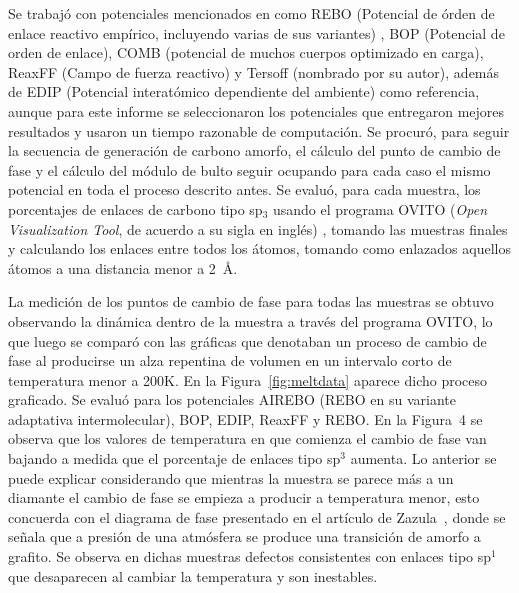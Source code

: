 \documentclass[aps,prl,twocolumn,superscriptaddress,groupedaddress]{revtex4}
\begin{document}
 Se trabajó con potenciales mencionados en \cite{ACPot1} como REBO (Potencial de órden de enlace reactivo empírico, incluyendo varias de sus variantes) , BOP (Potencial de orden de enlace), COMB (potencial de muchos cuerpos optimizado en carga), ReaxFF (Campo de fuerza reactivo) y Tersoff (nombrado por su autor), además de EDIP (Potencial interatómico dependiente del ambiente) como referencia, aunque para este informe se seleccionaron los potenciales que entregaron mejores resultados y usaron un tiempo razonable de computación. Se procuró, para seguir la secuencia de generación de carbono amorfo, el cálculo del punto de cambio de fase y el cálculo del módulo de bulto seguir ocupando para cada caso el mismo potencial en toda el proceso descrito antes. Se evaluó, para cada muestra, los porcentajes de enlaces de carbono tipo sp$_3$ usando el programa OVITO (\textit{Open Visualization Tool}, de acuerdo a su sigla en inglés) \cite{Ovito}, tomando las muestras finales y calculando los enlaces entre todos los átomos, tomando como enlazados aquellos átomos a una distancia menor a 2~\AA. 

La medición de los puntos de cambio de fase para todas las muestras se obtuvo observando la dinámica dentro de la muestra a través del programa OVITO, lo que luego se comparó con las gráficas que denotaban un proceso de cambio de fase al producirse un alza repentina de volumen en un intervalo corto de temperatura menor a 200K. En la Figura~\ref{fig:meltdata} aparece dicho proceso graficado. Se evaluó para los potenciales AIREBO (REBO en su variante adaptativa intermolecular), BOP, EDIP, ReaxFF y REBO. En la Figura~4 se observa que los valores de temperatura en que comienza el cambio de fase van bajando a medida que el porcentaje de enlaces tipo sp$^3$ aumenta. Lo anterior se puede explicar considerando que mientras la muestra se parece más a un diamante el cambio de fase se empieza a producir a temperatura menor, esto concuerda con el diagrama de fase presentado en el artículo de Zazula~\cite{Zazula}, donde se señala que a presión de una atmósfera  se produce una transición de amorfo a grafito. Se observa en dichas muestras defectos consistentes con enlaces tipo sp$^1$ que desaparecen al cambiar la temperatura y son inestables. 
\end{document}
